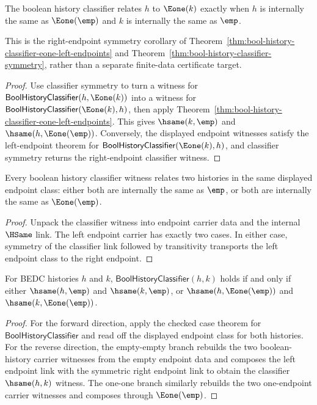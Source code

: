 \begin{corollary}
\label{thm:bool-history-classifier-eone-right-endpoints}
The boolean history classifier relates $h$ to $\Eone(k)$ exactly when
$h$ is internally the same as $\Eone(\emp)$ and $k$ is internally the same as
$\emp$.

This is the right-endpoint symmetry corollary of
Theorem~\ref{thm:bool-history-classifier-eone-left-endpoints} and
Theorem~\ref{thm:bool-history-classifier-symmetry}, rather than a separate
finite-data certificate target.
\end{corollary}
\begin{proof}
Use classifier symmetry to turn a witness for
$\mathsf{BoolHistoryClassifier}(h,\Eone(k))$ into a witness for
$\mathsf{BoolHistoryClassifier}(\Eone(k),h)$, then apply
Theorem~\ref{thm:bool-history-classifier-eone-left-endpoints}. This gives
$\hsame(k,\emp)$ and $\hsame(h,\Eone(\emp))$. Conversely, the displayed
endpoint witnesses satisfy the left-endpoint theorem for
$\mathsf{BoolHistoryClassifier}(\Eone(k),h)$, and classifier symmetry returns
the right-endpoint classifier witness.
\end{proof}

\begin{theorem}
\label{thm:bool-history-classifier-cases}
Every boolean history classifier witness relates two histories in the same
displayed endpoint class: either both are internally the same as \(\emp\), or
both are internally the same as \(\Eone(\emp)\).
\end{theorem}
\begin{proof}
Unpack the classifier witness into endpoint carrier data and the internal
\(\HSame\) link. The left endpoint carrier has exactly two cases. In either
case, symmetry of the classifier link followed by transitivity transports the
left endpoint class to the right endpoint.
\end{proof}

\begin{theorem}
\label{thm:bool-history-classifier-endpoint-exactness}
For BEDC histories $h$ and $k$, $\mathsf{BoolHistoryClassifier}(h,k)$ holds
if and only if either $\hsame(h,\emp)$ and $\hsame(k,\emp)$, or
$\hsame(h,\Eone(\emp))$ and $\hsame(k,\Eone(\emp))$.
\end{theorem}
\begin{proof}
For the forward direction, apply the checked case theorem for
$\mathsf{BoolHistoryClassifier}$ and read off the displayed endpoint class for
both histories. For the reverse direction, the empty-empty branch rebuilds the
two boolean-history carrier witnesses from the empty endpoint data and composes
the left endpoint link with the symmetric right endpoint link to obtain the
classifier $\hsame(h,k)$ witness. The one-one branch similarly rebuilds the two
one-endpoint carrier witnesses and composes through $\Eone(\emp)$.
\end{proof}

